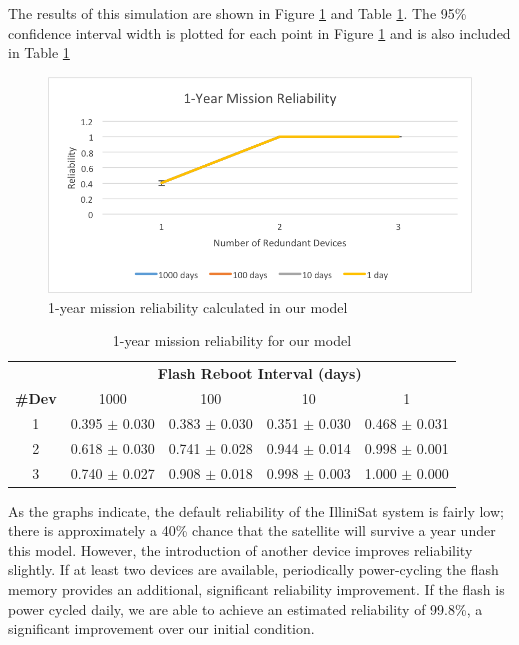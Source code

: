 The results of this simulation are shown in Figure \ref{fig:reliability} and Table \ref{tab:reliability}.  The 95\% confidence interval width is plotted for each point in Figure \ref{fig:reliability} and is also included in Table \ref{tab:reliability}

\begin{figure}[width = 0.5\textwidth]
\centering
\includegraphics[scale=0.6]{reliability}
\caption{1-year mission reliability calculated in  our model}\label{fig:reliability}
\end{figure}

\begin{table}[width = 0.5\textwidth]
{\scriptsize
\centering
\begin{tabular}{ccccc}
\toprule
& \multicolumn{4}{c}{\bf Flash Reboot Interval (days)}\\
\cmidrule(r){2-5}
{\bf \#Dev} & 1000 & 100 & 10 & 1\\
\midrule
1 & 0.395 $\pm$ 0.030 & 0.383 $\pm$ 0.030 & 0.351 $\pm$ 0.030 & 0.468 $\pm$ 0.031 \\
2 & 0.618 $\pm$ 0.030 & 0.741 $\pm$ 0.028 & 0.944 $\pm$ 0.014 & 0.998 $\pm$ 0.001 \\
3 & 0.740 $\pm$ 0.027 & 0.908 $\pm$ 0.018 & 0.998 $\pm$ 0.003 & 1.000 $\pm$ 0.000 \\
\bottomrule
\end{tabular}
\caption{1-year mission reliability for our model}\label{tab:reliability}
}
\end{table}

As the graphs indicate, the default reliability of the IlliniSat system is fairly low; there is approximately a 40\% chance that the satellite will survive a year under this model.  However, the introduction of another device improves reliability slightly.  If at least two devices are available, periodically power-cycling the flash memory provides an additional, significant reliability improvement.  If the flash is power cycled daily, we are able to achieve an estimated reliability of 99.8\%, a significant improvement over our initial condition.

